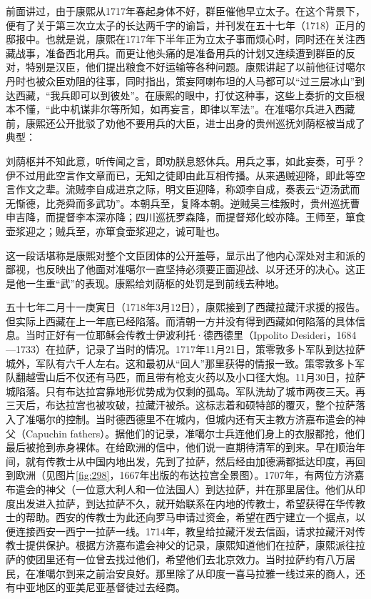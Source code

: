 
前面讲过，由于康熙从1717年春起身体不好，群臣催他早立太子。在这个背景下，便有了关于第三次立太子的长达两千字的谕旨，并刊发在五十七年（1718）正月的邸报中。也就是说，康熙在1717年下半年正为立太子事而烦心时，同时还在关注西藏战事，准备西北用兵。而更让他头痛的是准备用兵的计划又连续遭到群臣的反对，特别是汉臣，他们提出粮食不好运输等各种问题。康熙讲起了以前他征讨噶尔丹时也被众臣劝阻的往事，同时指出，策妄阿喇布坦的人马都可以“过三层冰山”到达西藏，“我兵即可以到彼处”。在康熙的眼中，打仗这种事，这些上奏折的文臣根本不懂，“此中机谋非尔等所知，如再妄言，即律以军法”。在准噶尔兵进入西藏前，康熙还公开批驳了劝他不要用兵的大臣，进士出身的贵州巡抚刘荫枢被当成了典型：



\begin{bookquote}刘荫枢并不知此意，听传闻之言，即劝朕息怒休兵。用兵之事，如此妄奏，可乎？伊不过用此空言作文章而已，无知之徒即由此互相传播。从来遇贼迎降，即此等空言作文之辈。流贼李自成进京之际，明文臣迎降，称颂李自成，奏表云“迈汤武而无惭德，比尧舜而多武功”。本朝兵至，复降本朝。逆贼吴三桂叛时，贵州巡抚曹申吉降，而提督李本深亦降；四川巡抚罗森降，而提督郑化蛟亦降。王师至，箪食壶浆迎之；贼兵至，亦箪食壶浆迎之，诚可耻也。\end{bookquote}


这一段话堪称是康熙对整个文臣团体的公开羞辱，显示出了他内心深处对主和派的鄙视，也反映出了他面对准噶尔一直坚持必须要正面迎战、以牙还牙的决心。这正是他一生重“武”的表现。康熙给刘荫枢的处罚是到前线去种地。



五十七年二月十一庚寅日（1718年3月12日），康熙接到了西藏拉藏汗求援的报告。但实际上西藏在上一年底已经陷落。而清朝一方并没有得到西藏如何陷落的具体信息。当时正好有一位耶稣会传教士伊波利托·德西德里（Ippolito Desideri，1684—1733）在拉萨，记录了当时的情况。1717年11月21日，策零敦多卜军队到达拉萨城外，军队有六千人左右。这和最初从“回人”那里获得的情报一致。策零敦多卜军队翻越雪山后不仅还有马匹，而且带有枪支火药以及小口径大炮。11月30日，拉萨城陷落。只有布达拉宫靠地形优势成为仅剩的孤岛。军队洗劫了城市两夜三天。再三天后，布达拉宫也被攻破，拉藏汗被杀。这标志着和硕特部的覆灭，整个拉萨落入了准噶尔的控制。当时德西德里不在城内，但城内还有天主教方济嘉布遣会的神父（Capuchin fathers）。据他们的记录，准噶尔士兵连他们身上的衣服都抢，他们最后被抢到赤身裸体。在给欧洲的信中，他们说一直期待清军的到来。早在顺治年间，就有传教士从中国内地出发，先到了拉萨，然后经由加德满都抵达印度，再回到欧洲（见图片\ref{fig:298}，1667年出版的布达拉宫全景图）。1707年，有两位方济嘉布遣会的神父（一位意大利人和一位法国人）到达拉萨，并在那里居住。他们从印度出发进入拉萨，到达拉萨不久，就开始联系在内地的传教士，希望获得在华传教士的帮助。西安的传教士为此还向罗马申请过资金，希望在西宁建立一个据点，以便连接西安一西宁一拉萨一线。1714年，教皇给拉藏汗发去信函，请求拉藏汗对传教士提供保护。根据方济嘉布遣会神父的记录，康熙知道他们在拉萨，康熙派往拉萨的使团里还有一位曾去找过他们，希望他们去北京效力。当时拉萨约有八万居民，在准噶尔到来之前治安良好。那里除了从印度一喜马拉雅一线过来的商人，还有中亚地区的亚美尼亚基督徒过去经商。


